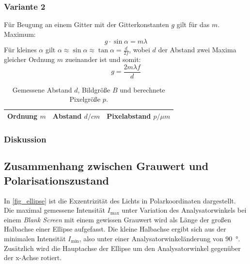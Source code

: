 \documentclass[
	a4paper,
	12pt,
	pagesize,
	ngerman
]{scrartcl}
\begin{document}
			\subsubsection*{Variante 2}

			Für Beugung an einem Gitter mit der Gitterkonstanten $g$ gilt für das $m$. Maximum:
			\begin{equation}
				g \cdot \sin{\alpha} = m \lambda
			\end{equation}
			Für kleines $\alpha$ gilt $\alpha\approx\sin{\alpha}\approx\tan{\alpha}=\frac{d}{2f}$, wobei $d$ der Abstand zwei Maxima gleicher Ordnung $m$  zueinander ist und somit:
			\begin{equation}
				g = \frac{2m\lambda f}{d}
			\end{equation}



\begin{table}[H]
		\centering
		\begin{tabular}{ c | c | c }
			 Ordnung $m$ & Abstand $d/\si{cm}$ & Pixelabstand $p/\si{\mu m}$ \\ \hline
			 
		\end{tabular}
		\caption{
		Gemessene Abstand $d$, Bildgröße $B$ und berechnete Pixelgröße $p$.
		}
		\label{tb_gitter}
\end{table}
			\subsubsection*{Diskussion}

		\subsection{Zusammenhang zwischen Grauwert und Polarisationszustand}
		In \cref{fig_ellipse} ist die Exzentrizität des Lichts in Polarkoordinaten dargestellt.
		Die maximal gemessene Intensität $I_\text{max}$ unter Variation des Analysatorwinkels bei einem \textit{Blank Screen} mit einem gewissen Grauwert wird als Länge der großen Halbachse einer Ellipse aufgefasst.
		Die kleine Halbachse ergibt sich aus der minimalen Intensität $I_\text{min}$, also unter einer Analysatorwinkeländerung von \SI{90}{\degree}.
		Zusätzlich wird die Hauptachse der Ellipse um den Analysatorwinkel gegenüber der x-Achse rotiert.
\end{document}
